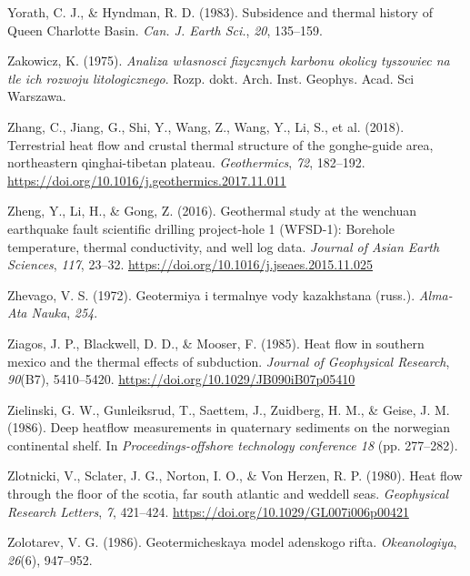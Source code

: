 \documentclass[draft,linenumbers]{agujournal2018}
\begin{document}
\leavevmode{}%
Yorath, C. J., \& Hyndman, R. D. (1983). Subsidence and thermal history
of {Queen Charlotte Basin}. \emph{Can. J. Earth Sci.}, \emph{20},
135--159.

\leavevmode{}%
Zakowicz, K. (1975). \emph{Analiza w{ł}asnosci fizycznych karbonu
okolicy tyszowiec na tle ich rozwoju litologicznego}. Rozp. dokt. Arch.
Inst. Geophys. Acad. Sci Warszawa.

\leavevmode{}%
Zhang, C., Jiang, G., Shi, Y., Wang, Z., Wang, Y., Li, S., et al.
(2018). Terrestrial heat flow and crustal thermal structure of the
gonghe-guide area, northeastern qinghai-tibetan plateau.
\emph{Geothermics}, \emph{72}, 182--192.
\url{https://doi.org/10.1016/j.geothermics.2017.11.011}

\leavevmode{}%
Zheng, Y., Li, H., \& Gong, Z. (2016). Geothermal study at the wenchuan
earthquake fault scientific drilling project-hole 1 ({WFSD}-1): Borehole
temperature, thermal conductivity, and well log data. \emph{Journal of
Asian Earth Sciences}, \emph{117}, 23--32.
\url{https://doi.org/10.1016/j.jseaes.2015.11.025}

\leavevmode{}%
Zhevago, V. S. (1972). Geotermiya i termalnye vody kazakhstana (russ.).
\emph{Alma-Ata Nauka}, \emph{254}.

\leavevmode{}%
Ziagos, J. P., Blackwell, D. D., \& Mooser, F. (1985). Heat flow in
southern mexico and the thermal effects of subduction. \emph{Journal of
Geophysical Research}, \emph{90}(B7), 5410--5420.
\url{https://doi.org/10.1029/JB090iB07p05410}

\leavevmode{}%
Zielinski, G. W., Gunleiksrud, T., Saettem, J., Zuidberg, H. M., \&
Geise, J. M. (1986). Deep heatflow measurements in quaternary sediments
on the norwegian continental shelf. In \emph{Proceedings-offshore
technology conference 18} (pp. 277--282).

\leavevmode{}%
Zlotnicki, V., Sclater, J. G., Norton, I. O., \& Von Herzen, R. P.
(1980). Heat flow through the floor of the scotia, far south atlantic
and weddell seas. \emph{Geophysical Research Letters}, \emph{7},
421--424. \url{https://doi.org/10.1029/GL007i006p00421}

\leavevmode{}%
Zolotarev, V. G. (1986). Geotermicheskaya model adenskogo rifta.
\emph{Okeanologiya}, \emph{26}(6), 947--952.
\end{document}
